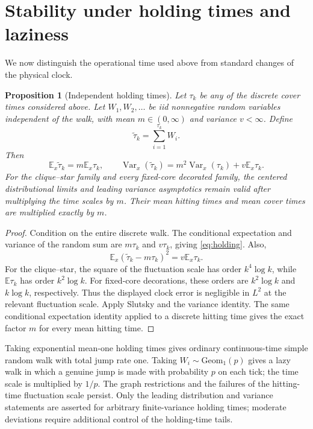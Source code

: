 \documentclass[11pt]{amsart}
\newtheorem{proposition}[theorem]{Proposition}
\theoremstyle{remark}
\numberwithin{equation}{section}
\DeclareMathOperator{\Var}{Var}
\newcommand{\E}{\mathbb{E}}
\newcommand{\Geom}{\mathrm{Geom}}
\begin{document}
\section{Stability under holding times and laziness}\label{sec:holding}

We now distinguish the operational time used above from standard changes of the physical clock.

\begin{proposition}[Independent holding times]\label{prop:holding}
Let $\tau_k$ be any of the discrete cover times considered above. Let $W_1,W_2,\dots$ be iid nonnegative random variables independent of the walk, with mean $m\in(0,\infty)$ and variance $v<\infty$. Define
\[
\widetilde\tau_k=\sum_{i=1}^{\tau_k}W_i.
\]
Then
\begin{equation}\label{eq:holding}
\E_x\widetilde\tau_k=m\E_x\tau_k,\qquad \Var_x(\widetilde\tau_k)=m^2\Var_x(\tau_k)+v\E_x\tau_k.
\end{equation}
For the clique--star family and every fixed-core decorated family, the centered distributional limits and leading variance asymptotics remain valid after multiplying the time scales by $m$. Their mean hitting times and mean cover times are multiplied exactly by $m$.
\end{proposition}

\begin{proof}
Condition on the entire discrete walk. The conditional expectation and variance of the random sum are $m\tau_k$ and $v\tau_k$, giving \eqref{eq:holding}. Also,
\[
\E_x(\widetilde\tau_k-m\tau_k)^2=v\E_x\tau_k.
\]
For the clique--star, the square of the fluctuation scale has order $k^4\log k$, while $\E\tau_k$ has order $k^2\log k$. For fixed-core decorations, these orders are $k^2\log k$ and $k\log k$, respectively. Thus the displayed clock error is negligible in $L^2$ at the relevant fluctuation scale. Apply Slutsky and the variance identity. The same conditional expectation identity applied to a discrete hitting time gives the exact factor $m$ for every mean hitting time.
\end{proof}

Taking exponential mean-one holding times gives ordinary continuous-time simple random walk with total jump rate one. Taking $W_i\sim\Geom_1(p)$ gives a lazy walk in which a genuine jump is made with probability $p$ on each tick; the time scale is multiplied by $1/p$. The graph restrictions and the failures of the hitting-time fluctuation scale persist. Only the leading distribution and variance statements are asserted for arbitrary finite-variance holding times; moderate deviations require additional control of the holding-time tails.
\end{document}
